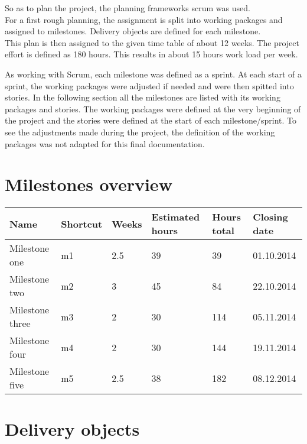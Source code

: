 So as to plan the project, the planning frameworks scrum was used.\\
For a first rough planning, the assignment is split into working packages and assigned to milestones. Delivery objects are defined for each milestone.\\
This plan is then assigned to the given time table of about 12 weeks. The project effort is defined as 180 hours. This results in about 15 hours work load per week.

As working with Scrum, each milestone was defined as a sprint. At each start of a sprint, the working packages were adjusted if needed and were then spitted into stories. In the following section all the milestones are listed with its working packages and stories. The working packages were defined at the very beginning of the project and the stories were defined at the start of each milestone/sprint. To see the adjustments made during the project, the definition of the working packages was not adapted for this final documentation.
 

\section{Milestones overview}

	\begin{tabular}{ | p{3cm} | p{2cm} | p{2cm} | p{2cm} | p{2cm} | p{2cm} |}
	\hline
	\textbf{Name} & \textbf{Shortcut} & \textbf{Weeks} & \textbf{Estimated hours} & \textbf{Hours  \mbox{total}} & \textbf{Closing date} \\ \hline
	Milestone one & m1 & 2.5 & 39 & 39 & 01.10.2014 \\
	Milestone two & m2 & 3 & 45 & 84 & 22.10.2014 \\
	Milestone three & m3 & 2 & 30 & 114 & 05.11.2014 \\
	Milestone four & m4 & 2 & 30 & 144 & 19.11.2014 \\
	Milestone five & m5 & 2.5 & 38 & 182 & 08.12.2014 \\
	\hline
	\end{tabular}


\section{Delivery objects}

